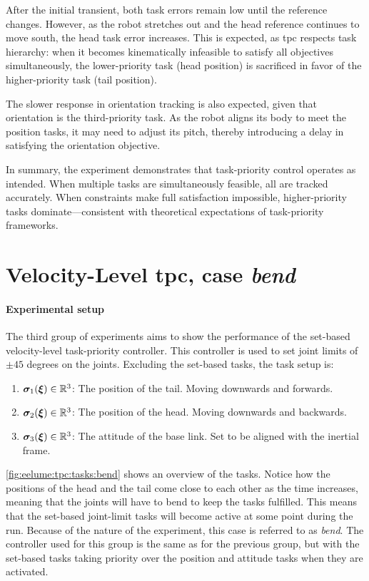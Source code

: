 After the initial transient, both task errors remain low until the reference changes. However, as the robot stretches out and the head reference continues to move south, the head task error increases. This is expected, as \gls{tpc} respects task hierarchy: when it becomes kinematically infeasible to satisfy all objectives simultaneously, the lower-priority task (head position) is sacrificed in favor of the higher-priority task (tail position).

The slower response in orientation tracking is also expected, given that orientation is the third-priority task. As the robot aligns its body to meet the position tasks, it may need to adjust its pitch, thereby introducing a delay in satisfying the orientation objective.

In summary, the experiment demonstrates that task-priority control operates as intended. When multiple tasks are simultaneously feasible, all are tracked accurately. When constraints make full satisfaction impossible, higher-priority tasks dominate—consistent with theoretical expectations of task-priority frameworks.


\FloatBarrier

\newpage
\section{Velocity-Level \gls{tpc}, case \textit{bend}}

\paragraph{Experimental setup}
The third group of experiments aims to show the performance of the set-based
velocity-level task-priority controller. This controller is used to set
joint limits of \(\pm 45\) degrees on the joints.
Excluding the set-based tasks, the task setup is:
\begin{enumerate}
    \item \(\bm{\sigma}_1(\bm{\xi}) \in \mathbb{R}^3\): The position of the tail. Moving downwards and forwards.
    \item \(\bm{\sigma}_2(\bm{\xi}) \in \mathbb{R}^3\): The position of the head. Moving downwards and backwards.
    \item \(\bm{\sigma}_3(\bm{\xi}) \in \mathbb{R}^3\): The attitude of the base link. Set to be aligned with the inertial frame.
\end{enumerate}
\autoref{fig:eelume:tpc:tasks:bend} shows an overview of the tasks. Notice how
the positions of the head and the tail come close to each other as the time increases, meaning
that the joints will have to bend to keep the tasks fulfilled. This means
that the set-based joint-limit tasks will become active at some point during the run. Because
of the nature of the experiment, this case is referred to as \textit{bend}.
The controller
used for this group is the same as for the previous group, but with the set-based
tasks taking priority over the position and attitude tasks when they are activated.

